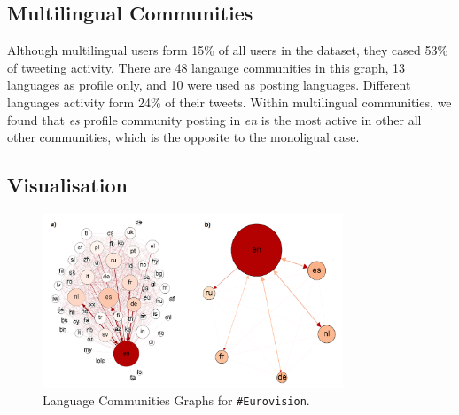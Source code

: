 \documentclass{llncs}
\begin{document}

\subsection{Multilingual Communities}
Although multilingual users form 15\% of all users in the dataset,
they cased 53\% of tweeting activity. There are 48 langauge communities
in this graph, 13 languages as profile only, and 10 were used as posting 
languages. Different languages activity form 24\% of their tweets. Within 
multilingual communities, we found that \emph{es} profile community posting 
in \emph{en} is the most active in other all other communities, which is the 
opposite to the monoligual case. 



\subsection{Visualisation}

\begin{figure}[htb]
\centering
\includegraphics[width=0.8\textwidth]{images/communitiesgraphs.png}
\caption{Language Communities Graphs for {\texttt{\#Eurovision}}.}
\label{fig:communitiesgraphs}

\end{figure}
\end{document}
